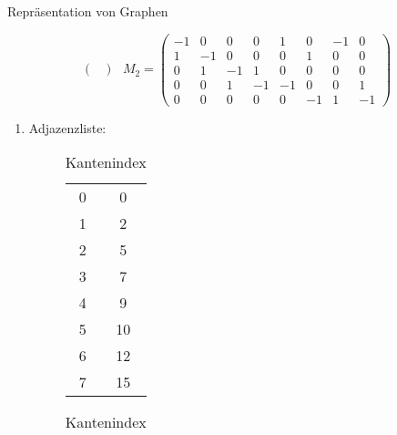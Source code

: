 \documentclass[11pt,a4paper]{article}
\begin{document}
\begin{aufgabe}{1}{Repräsentation von Graphen}
\begin{enumerate}
\begin{equation*}
\begin{pmatrix}
            \end{pmatrix}\,\,\,\,
            M_2 = \begin{pmatrix}
                -1 & 0 & 0 & 0 & 1 & 0 & -1 & 0 \\
                1 & -1 & 0 & 0 & 0 & 1 & 0 & 0 \\
                0 & 1 & -1 & 1 & 0 & 0 & 0 & 0 \\
                0 & 0 & 1 & -1 & -1 & 0 & 0 & 1 \\
                0 & 0 & 0 & 0 & 0 & -1 & 1 & -1
            \end{pmatrix}
        \end{equation*}
    \end{enumerate}
\end{aufgabe}
\begin{loesung}
    \begin{enumerate}
        \item 
        \begin{description}
            \item[Adjazenzliste:] 
            \begin{table}[!htb]
                \centering
                \parbox{0.45\linewidth}{
                    \centering
                    \begin{tabular}[t]{c|c|}
                        \cline{2-2}
                        0 & 0 \\
                        \cline{2-2}
                        1 & 2 \\
                        \cline{2-2}
                        2 & 5 \\
                        \cline{2-2}
                        3 & 7 \\
                        \cline{2-2}
                        4 & 9 \\
                        \cline{2-2}
                        5 & 10 \\
                        \cline{2-2}
                        6 & 12 \\
                        \cline{2-2}
                        7 & 15 \\
                        \cline{2-2}
                    \end{tabular}
                    \caption*{Kantenindex}
                }
                \parbox{0.45\linewidth}{
                    \centering
                    \begin{tabular}[t]{c|c|}
                        \cline{2-2}

\end{tabular}}
\end{table}
\end{description}
\end{enumerate}
\end{loesung}
\end{document}
